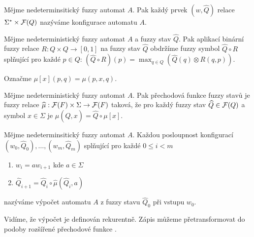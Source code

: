 \documentclass[a4paper,10pt]{article}
\begin{document}
\begin{definition}
  Mějme nedeterminsitický fuzzy automat $A$. Pak každý prvek $(w, \widehat{Q})$ relace $\Sigma^* \times \mathcal{F}(Q)$ nazýváme konfigurace automatu $A$.
\end{definition}


\begin{definition}
 Mějme nedeterministický fuzzy automat $A$ a fuzzy stav $\widehat{Q}$. Pak aplikací binární fuzzy relace $R: Q \times Q \rightarrow [0, 1]$ na fuzzy stav $\widehat{Q}$ obdržíme fuzzy symbol $\widehat{Q} \circ R$ splňující pro každé $p \in Q$: $(\widehat{Q} \circ R )(p) = \max_{q \in Q} (\widehat{Q}(q) \otimes R(q, p))$.
 
\end{definition}

\begin{notation*}
 Označme $\mu[x](p, q) = \mu(p, x, q)$.
\end{notation*}

\begin{definition}\label{def-PreFunFuzzStav}
 Mějme nedeterministický fuzzy automat $A$. Pak přechodová funkce fuzzy stavů je fuzzy relace $\widehat{\mu}: \mathcal{F}(F) \times \Sigma \rightarrow \mathcal{F}(F)$ taková, že pro každý fuzzy stav $\widehat{Q} \in \mathcal{F}(Q)$ a symbol $x \in \Sigma$ je $\widehat{\mu}(\widehat{Q}, x) = \widehat{Q} \circ \mu[x]$.
\end{definition}

\begin{definition}
  Mějme nedeterminsitický fuzzy automat $A$. Každou posloupnost konfigurací $(w_0, \widehat{Q}_0), \dots, (w_m, \widehat{Q}_m)$ splňující pro každé $0 \leq i < m$
  \begin{enumerate}
   \item $w_{i} = a w_{i+1}$ kde $a \in \Sigma$
   \item $\widehat{Q}_{i+1} = \widehat{Q}_{i} \circ \widehat{\mu}(\widehat{Q}_{i}, a)$
  \end{enumerate}
  nazýváme výpočet automatu $A$ z fuzzy stavu $\widehat{Q}_0$ při vstupu $w_0$.
\end{definition}

Vidíme, že výpočet je definován rekurentně. Zápis můžeme přetransformovat do podoby rozšířené přechodové funkce \cite{IgnCirBog-DetFuzAutMemValComResLat}.
\end{document}
